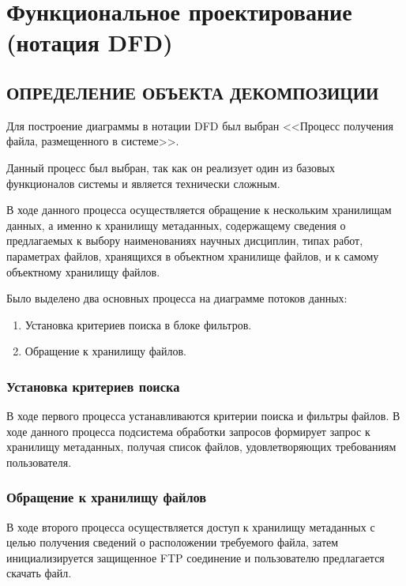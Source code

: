 \documentclass[a4paper,14pt]{extarticle}
\begin{document}
\newpage
\section{Функциональное проектирование (нотация DFD)}

\subsection{ОПРЕДЕЛЕНИЕ ОБЪЕКТА ДЕКОМПОЗИЦИИ}
Для построение диаграммы в нотации DFD был выбран <<Процесс получения файла, размещенного в системе>>. 

Данный процесс был выбран, так как он реализует один из базовых функционалов системы и является технически сложным. 

В ходе данного процесса осуществляется обращение к нескольким хранилищам данных, а именно к хранилищу метаданных, содержащему сведения о предлагаемых к выбору наименованиях научных дисциплин, типах работ, параметрах файлов, хранящихся в объектном хранилище файлов, и к самому объектному хранилищу файлов.


Было выделено два основных процесса на диаграмме потоков данных:
\begin{enumerate}
	\item Установка критериев
	поиска в блоке фильтров.
	\item Обращение
	к хранилищу файлов.
\end{enumerate}
\subsubsection{Установка критериев поиска}
В ходе первого процесса устанавливаются критерии поиска и фильтры файлов. В ходе данного процесса подсистема обработки запросов формирует запрос к хранилищу метаданных, получая список файлов, удовлетворяющих требованиям пользователя. 
\subsubsection{Обращение к хранилищу файлов}
В ходе второго процесса осуществляется доступ к хранилищу метаданных с целью получения сведений о расположении требуемого файла, затем инициализируется защищенное FTP соединение и пользователю предлагается скачать файл. 
\end{document}

